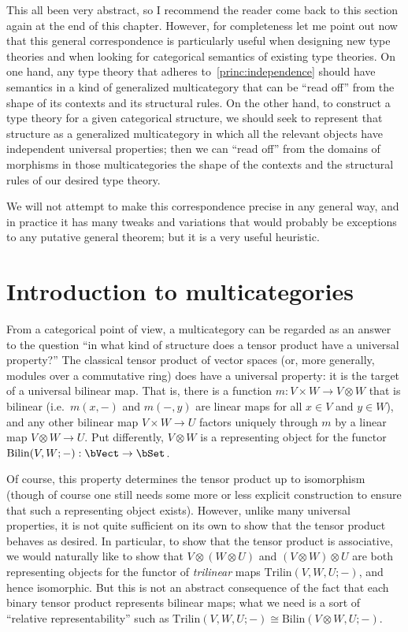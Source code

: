 \documentclass{book}
\let\tensor\otimes
\begin{document}
This all been very abstract, so I recommend the reader come back to this section again at the end of this chapter.
However, for completeness let me point out now that this general correspondence is particularly useful when designing new type theories and when looking for categorical semantics of existing type theories.
On one hand, any type theory that adheres to~\eqref{princ:independence} should have semantics in a kind of generalized multicategory that can be ``read off'' from the shape of its contexts and its structural rules.
On the other hand, to construct a type theory for a given categorical structure, we should seek to represent that structure as a generalized multicategory in which all the relevant objects have independent universal properties; then we can ``read off'' from the domains of morphisms in those multicategories the shape of the contexts and the structural rules of our desired type theory.

We will not attempt to make this correspondence precise in any general way, and in practice it has many tweaks and variations that would probably be exceptions to any putative general theorem; but it is a very useful heuristic.


\section{Introduction to multicategories}
\label{sec:multicats-catth}

From a categorical point of view, a multicategory can be regarded as an answer to the question ``in what kind of structure does a tensor product have a universal property?''
The classical tensor product of vector spaces (or, more generally, modules over a commutative ring) does have a universal property: it is the target of a universal bilinear map.
That is, there is a function $m:V\times W \to V\tensor W$ that is bilinear (i.e.\ $m(x,-)$ and $m(-,y)$ are linear maps for all $x\in V$ and $y\in W$), and any other bilinear map $V\times W \to U$ factors uniquely through $m$ by a linear map $V\tensor W \to U$.
Put differently, $V\tensor W$ is a representing object for the functor $\mathrm{Bilin}(V,W;-) : \bVect \to \bSet$.

Of course, this property determines the tensor product up to isomorphism (though of course one still needs some more or less explicit construction to ensure that such a representing object exists).
However, unlike many universal properties, it is not quite sufficient on its own to show that the tensor product behaves as desired.
In particular, to show that the tensor product is associative, we would naturally like to show that $V\tensor (W\tensor U)$ and $(V\tensor W)\tensor U$ are both representing objects for the functor of \emph{trilinear} maps $\mathrm{Trilin}(V,W,U;-)$, and hence isomorphic.
But this is not an abstract consequence of the fact that each binary tensor product represents bilinear maps;
what we need is a sort of ``relative representability'' such as $\mathrm{Trilin}(V,W,U;-) \cong \mathrm{Bilin}(V\tensor W,U;-)$.
\end{document}
